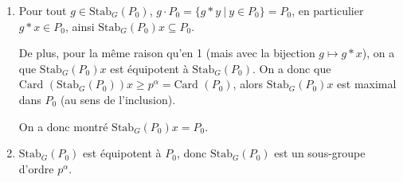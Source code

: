\documentclass[]{article}
\theoremstyle{remark}
\theoremstyle{definition}
\begin{document}
\begin{enumerate}
	\item Pour tout $g \in \text{Stab}_G (P_0)$, $g \cdot P_0 = \{g * y ~ | ~ y \in P_0\} = P_0$, en particulier $g*x \in P_0$, ainsi $\text{Stab}_G(P_0)x \subseteq P_0$.
	
	De plus, pour la même raison qu'en 1 (mais avec la bijection $g \mapsto g * x$), on a que $\text{Stab}_G(P_0) x$ est équipotent à $\text{Stab}_G(P_0)$. On a donc que $\text{Card } (\text{Stab}_G(P_0)) x \geqslant p^\alpha = \text{Card } (P_0)$, alors $\text{Stab}_G(P_0) x$ est maximal dans $P_0$ (au sens de l'inclusion).
	
	On a donc montré $\text{Stab}_G(P_0) x = P_0$.
	
	\item $\text{Stab}_G(P_0)$ est équipotent à $P_0$, donc $\text{Stab}_G(P_0)$ est un sous-groupe d'ordre $p^\alpha$.
\end{enumerate}
\end{document}
